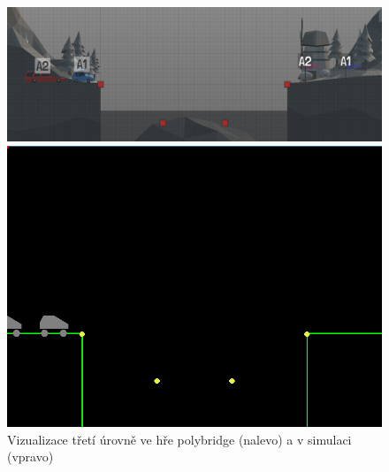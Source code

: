 \begin{figure}[ht]
    \centering
    \begin{minipage}{0.49\textwidth}
        \centering
        \includegraphics[width=\linewidth]{img/poly_lvl3.png}
    \end{minipage}\hfill
    \begin{minipage}{0.49\textwidth}
        \centering
        \includegraphics[width=\linewidth]{img/impl_lvl3.png}
    \end{minipage}
    \caption{Vizualizace třetí úrovně ve hře polybridge (nalevo) a v simulaci (vpravo)}
    \label{fig:4}
\end{figure}

